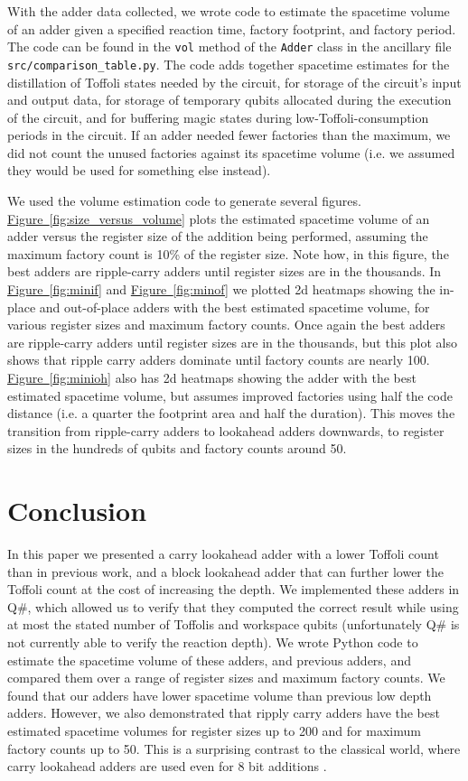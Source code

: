 \documentclass[onecolumn,unpublished]{quantumarticle}
\theoremstyle{definition}
\theoremstyle{definition}
\theoremstyle{definition}
\newcommand{\fig}[1]{\hyperref[fig:#1]{Figure~\ref*{fig:#1}}}
\begin{document}
With the adder data collected, we wrote code to estimate the spacetime volume of an adder given a specified reaction time, factory footprint, and factory period.
The code can be found in the \texttt{vol} method of the \texttt{Adder} class in the ancillary file \texttt{src/comparison\_table.py}.
The code adds together spacetime estimates for the distillation of Toffoli states needed by the circuit, for storage of the circuit's input and output data, for storage of temporary qubits allocated during the execution of the circuit, and for buffering magic states during low-Toffoli-consumption periods in the circuit.
If an adder needed fewer factories than the maximum, we did not count the unused factories against its spacetime volume (i.e. we assumed they would be used for something else instead).

We used the volume estimation code to generate several figures.
\fig{size_versus_volume} plots the estimated spacetime volume of an adder versus the register size of the addition being performed, assuming the maximum factory count is 10\% of the register size.
Note how, in this figure, the best adders are ripple-carry adders until register sizes are in the thousands.
In \fig{minif} and \fig{minof} we plotted 2d heatmaps showing the in-place and out-of-place adders with the best estimated spacetime volume, for various register sizes and maximum factory counts.
Once again the best adders are ripple-carry adders until register sizes are in the thousands, but this plot also shows that ripple carry adders dominate until factory counts are nearly 100.
\fig{minioh} also has 2d heatmaps showing the adder with the best estimated spacetime volume, but assumes improved factories using half the code distance (i.e. a quarter the footprint area and half the duration).
This moves the transition from ripple-carry adders to lookahead adders downwards, to register sizes in the hundreds of qubits and factory counts around 50.

\section{Conclusion}
\label{sec:conclusion}

In this paper we presented a carry lookahead adder with a lower Toffoli count than in previous work, and a block lookahead adder that can further lower the Toffoli count at the cost of increasing the depth.
We implemented these adders in Q\#, which allowed us to verify that they computed the correct result while using at most the stated number of Toffolis and workspace qubits (unfortunately Q\# is not currently able to verify the reaction depth).
We wrote Python code to estimate the spacetime volume of these adders, and previous adders, and compared them over a range of register sizes and maximum factory counts.
We found that our adders have lower spacetime volume than previous low depth adders.
However, we also demonstrated that ripply carry adders have the best estimated spacetime volumes for register sizes up to 200 and for maximum factory counts up to 50.
This is a surprising contrast to the classical world, where carry lookahead adders are used even for 8 bit additions \cite{shirriff2020reverseengineer8008}.
\end{document}
